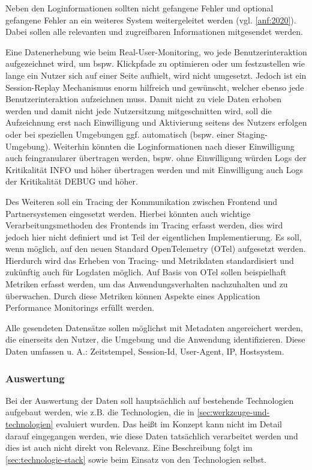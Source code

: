 	Neben den Loginformationen sollten nicht gefangene Fehler und optional gefangene Fehler an ein weiteres System weitergeleitet werden (vgl. \autoref{anf:2020}). Dabei sollen alle relevanten und zugreifbaren Informationen mitgesendet werden.
		
	Eine Datenerhebung wie beim Real-User-Monitoring, wo jede Benutzerinteraktion aufgezeichnet wird, um bspw. Klickpfade zu optimieren oder um festzustellen wie lange ein Nutzer sich auf einer Seite aufhielt, wird nicht umgesetzt. Jedoch ist ein Session-Replay Mechanismus enorm hilfreich und gewünscht, welcher ebenso jede Benutzerinteraktion aufzeichnen muss. Damit nicht zu viele Daten erhoben werden und damit nicht jede Nutzersitzung mitgeschnitten wird, soll die Aufzeichnung erst nach Einwilligung und Aktivierung seitens des Nutzers erfolgen oder bei speziellen Umgebungen ggf. automatisch (bspw. einer Staging-Umgebung). Weiterhin könnten die Loginformationen nach dieser Einwilligung auch feingranularer übertragen werden, bspw. ohne Einwilligung würden Logs der Kritikalität INFO und höher übertragen werden und mit Einwilligung auch Logs der Kritikalität DEBUG und höher.
		
	Des Weiteren soll ein Tracing der Kommunikation zwischen Frontend und Partnersystemen eingesetzt werden. Hierbei könnten auch wichtige Verarbeitungsmethoden des Frontends im Tracing erfasst werden, dies wird jedoch hier nicht definiert und ist Teil der eigentlichen Implementierung. Es soll, wenn möglich, auf den neuen Standard OpenTelemetry (OTel) aufgesetzt werden. Hierdurch wird das Erheben von Tracing- und Metrikdaten standardisiert und zukünftig auch für Logdaten möglich. Auf Basis von OTel sollen beispielhaft Metriken erfasst werden, um das Anwendungsverhalten nachzuhalten und zu überwachen. Durch diese Metriken können Aspekte eines Application Performance Monitorings erfüllt werden.
		
	Alle gesendeten Datensätze sollen möglichst mit Metadaten angereichert werden, die einerseits den Nutzer, die Umgebung und die Anwendung identifizieren. Diese Daten umfassen u. A.: Zeitstempel, Session-Id, User-Agent, IP, Hostsystem.
		
	\subsubsection{Auswertung}
		
	Bei der Auswertung der Daten soll hauptsächlich auf bestehende Technologien aufgebaut werden, wie z.B. die Technologien, die in \autoref{sec:werkzeuge-und-technologien} evaluiert wurden. Das heißt im Konzept kann nicht im Detail darauf eingegangen werden, wie diese Daten tatsächlich verarbeitet werden und dies ist auch nicht direkt von Relevanz. Eine Beschreibung folgt im \autoref{sec:technologie-stack} sowie beim Einsatz von den Technologien selbst.
		
